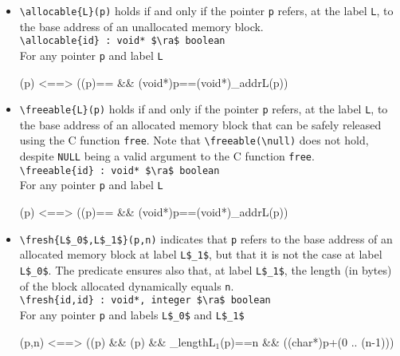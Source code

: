 \begin{itemize}
\item \lstinline|\allocable{L}(p)|
holds if and only if
the pointer \lstinline|p| refers, at the label \lstinline|L|, 
to the base address of 
an unallocated memory block.
\\ \makebox[5mm]{} \lstinline|\allocable{id} : void* $\ra$ boolean|
\\
For any pointer \lstinline|p| and label \lstinline|L|
\begin{listing-nonumber}
(p) <==> ((p)==\unallocated
                         && (void*)p==(void*)\base_addr{L}(p))
\end{listing-nonumber}
  
\item \lstinline|\freeable{L}(p)|
holds if and only if
the pointer \lstinline|p| refers, at the label \lstinline|L|, 
to the base address of an allocated memory block 
that can be safely released using the C function \lstinline|free|.
Note that \lstinline|\freeable(\null)| does not hold, despite \lstinline|NULL|
being a valid argument to the C function \lstinline|free|.
\\ \makebox[5mm]{} \lstinline|\freeable{id} : void* $\ra$ boolean|
\\
For any pointer \lstinline|p| and label \lstinline|L|
\begin{listing-nonumber}
(p) <==> ((p)==\dynamic
                        && (void*)p==(void*)\base_addr{L}(p))
\end{listing-nonumber}
  
\item \lstinline|\fresh{L$_0$,L$_1$}(p,n)|
  indicates that \lstinline|p| refers to the base address of an allocated memory block at label 
  \lstinline|L$_1$|, 
  but that it is not the case at label \lstinline|L$_0$|. 
  The predicate ensures also that, at label \lstinline|L$_1$|, the length
  (in bytes) of the block allocated dynamically equals  \lstinline|n|.
\\ \makebox[5mm]{} \lstinline|\fresh{id,id} : void*, integer $\ra$ boolean|
\\
For any pointer \lstinline|p| and labels \lstinline|L$_0$| and \lstinline|L$_1$|
\begin{listing-nonumber}
(p,n) <==> ((p) && (p) && 
                         \block_length{L$_1$}(p)==n &&
                         ((char*)p+(0 .. (n-1)))
\end{listing-nonumber}
\end{itemize}

